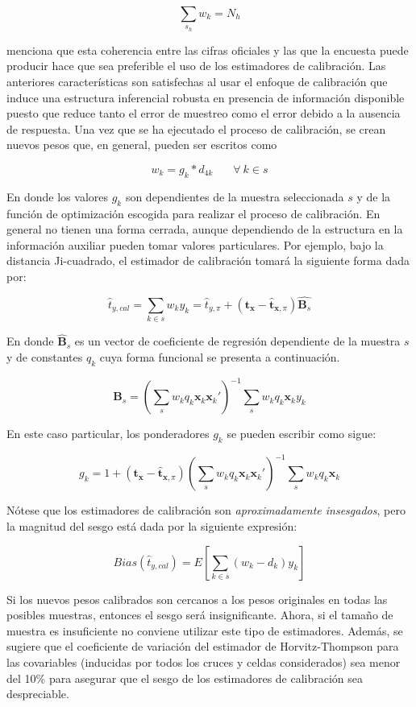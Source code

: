 \documentclass[
  12pt,
]{book}
\begin{document}
\[
\sum_{s_h} w_k = N_h
\]

\citet{Gutierrez_2016} menciona que esta coherencia entre las cifras oficiales y las que la encuesta puede producir hace que sea preferible el uso de los estimadores de calibración. Las anteriores características son satisfechas al usar el enfoque de calibración que induce una estructura inferencial robusta en presencia de información disponible puesto que reduce tanto el error de muestreo como el error debido a la ausencia de respuesta. Una vez que se ha ejecutado el proceso de calibración, se crean nuevos pesos que, en general, pueden ser escritos como

\[
w_k = g_k * d_{4k}  \ \ \ \ \ \ \ \ \forall \ k \in s
\]

En donde los valores \(g_k\) son dependientes de la muestra seleccionada \(s\) y de la función de optimización escogida para realizar el proceso de calibración. En general no tienen una forma cerrada, aunque dependiendo de la estructura en la información auxiliar pueden tomar valores particulares. Por ejemplo, bajo la distancia Ji-cuadrado, el estimador de calibración tomará la siguiente forma dada por:

\[
\hat{t}_{y, cal} 
= \sum_{k\in s} w_k y_k 
= \hat{t}_{y, \pi} + ( \mathbf{t_x} - \hat{\mathbf{t}}_{\mathbf{x}, \pi}) \hat{\mathbf{B}_s}
\]

En donde \(\hat{\mathbf{B}}_s\) es un vector de coeficiente de regresión dependiente de la muestra \(s\) y de constantes \(q_k\) cuya forma funcional se presenta a continuación.

\[
\hat{\mathbf{B}}_s = \left(\sum_s w_k q_k \mathbf{x}_k\mathbf{x}_k'\right)^{-1}\sum_s w_k q_k \mathbf{x}_k y_k
\]

En este caso particular, los ponderadores \(g_k\) se pueden escribir como sigue:

\[
g_k = 1 + ( \mathbf{t_x} - \hat{\mathbf{t}}_{\mathbf{x}, \pi}) \left(\sum_s w_k q_k \mathbf{x}_k\mathbf{x}_k'\right)^{-1}\sum_s w_k q_k \mathbf{x}_k
\]

Nótese que los estimadores de calibración son \emph{aproximadamente insesgados}, pero la magnitud del sesgo está dada por la siguiente expresión:

\[
Bias(\hat{t}_{y, cal}) = E\left[ \sum_{k \in s} (w_k - d_k) y_k \right]
\]

Si los nuevos pesos calibrados son cercanos a los pesos originales en todas las posibles muestras, entonces el sesgo será insignificante. Ahora, si el tamaño de muestra es insuficiente no conviene utilizar este tipo de estimadores. Además, se sugiere que el coeficiente de variación del estimador de Horvitz-Thompson para las covariables (inducidas por todos los cruces y celdas considerados) sea menor del 10\% para asegurar que el sesgo de los estimadores de calibración sea despreciable.
\end{document}
